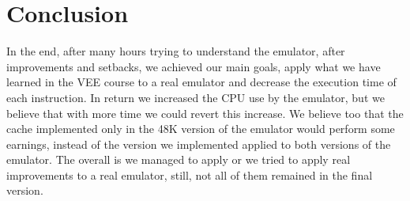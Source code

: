 \section{Conclusion}
In the end, after many hours trying to understand the emulator, after improvements and setbacks, we achieved our main goals, apply what we have learned in the VEE course to a real emulator and decrease the execution time of each instruction. In return we increased the CPU use by the emulator, but we believe that with more time we could revert this increase. We believe too that the cache implemented only in the 48K version of the emulator would perform some earnings, instead of the version we implemented applied to both versions of the emulator.
The overall is we managed to apply or we tried to apply real improvements to a real emulator, still, not all of them remained in the final version.